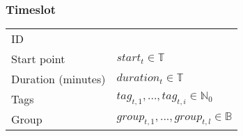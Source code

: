 \subsubsection{Timeslot}
\begin{tabular}{|p{3.5cm}||p{4.75cm}|}
\hline
    ID                	&  \\
    Start point         & $start_t\in\mathbb{T}$ \\
    Duration (minutes)  & $duration_t\in\mathbb{T}$ \\
    Tags                & $tag_{t,1},...,tag_{t,i}\in\mathbb{N}_0$ \\
    Group				& $group_{t,1},...,group_{t,l}\in\mathbb{B}$ \\
\hline
\end{tabular}